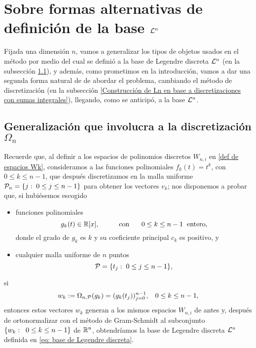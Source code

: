 \section{Sobre formas alternativas de definición de la base $\mathcal{L}^{n}$}

Fijada una dimensión $n$,
vamos a generalizar los tipos de objetos
usados
en el método por medio del cual
se definió a la base de Legendre discreta $\mathcal{L}^{n}$
(en la subsección 
\ref{Generalización que involucra a la discretización Omega n}),
y además, como prometimos en la introducción,
vamos a dar una segunda forma natural de
de abordar el problema, cambiando el método de 
discretización
(en la subsección 
\ref{Construcción de Ln en base a discretizaciones con sumas integrales}),
llegando, como se anticipó, a la base
$\mathcal{L}^{n}$.

\subsection{Generalización que involucra a la discretización $\Omega_{n}$}
\label{Generalización que involucra a la discretización Omega n}

Recuerde que, al definir a los espacios
de polinomios discretos
$W_{n,i}$ en \eqref{def de espacios Wk},
consideramos a
las funciones polinomiales 
$f_{k}(t)=t^{k}$, con $0 \leq k \leq n-1$, que después
discretizamos en la malla uniforme
$\mathcal{P}_{n}= \{ j: \hspace{0.1cm} 0 \leq j \leq n-1 \} $
para obtener los vectores $v_{k}$; nos
disponemos a probar que, si hubiésemos escogido
\begin{itemize}
\item funciones polinomiales
\[
g_{k}(t) \in \mathbb{R}[x], \hspace{1cm} 
\text{con }\hspace{0.5cm} 0 \leq k \leq n-1 \hspace{0.2cm} \text{entero},
\]
donde
el grado de $g_{k}$ es $k$ y su coeficiente principal 
$c_{k}$ es positivo, y

\item cualquier malla uniforme de $n$ puntos
\[
\mathcal{P}=\{t_{j} : \hspace{0.1cm} 0 \leq j \leq n-1 \},
\]
\end{itemize}
si 
\begin{equation}
\label{eq1: 31Oct}
w_{k} := \Omega_{n,\mathcal{P}}(g_{k})
=(g_{k}(t_{j}))_{j=0}^{n-1}, \hspace{0.3cm} 0 \leq k \leq n-1,
\end{equation}
entonces estos vectores $w_{k}$
generan a los mismos espacios $W_{n,i}$
de antes y,
después de ortonormalizar con el 
método de Gram-Schmidt
al subconjunto $\{w_{k}: \hspace{0.2cm} 0 \leq k \leq n-1\}$
de $\mathbb{R}^{n}$, obtendríamos la 
base de Legendre discreta $\mathcal{L}^{n}$ 
definida en \eqref{eq: base de Legendre discreta}. 


